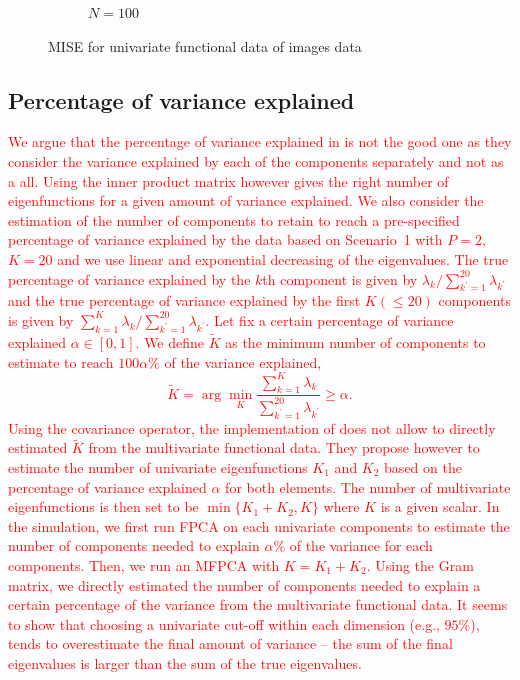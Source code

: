\begin{results}
\begin{figure}
\begin{subfigure}[b]{0.49\textwidth}
         \caption{$N = 100$}
         \label{fig:mise_mfd_2d_100}
    \end{subfigure}
    \caption{MISE for univariate functional data of images data}
    \label{fig:mise_mfd_2d}
\end{figure}

\end{results}



\subsection{Percentage of variance explained} %
\label{sub:percentage_of_variance_explained_simulation}

\textcolor{red}{We argue that the percentage of variance explained in \cite{happMultivariateFunctionalPrincipal2018a} is not the good one as they consider the variance explained by each of the components separately and not as a all. Using the inner product matrix however gives the right number of eigenfunctions for a given amount of variance explained.
We also consider the estimation of the number of components to retain to reach a pre-specified percentage of variance explained by the data based on Scenario~1 with $P = 2$, $K = 20$ and we use linear and exponential decreasing of the eigenvalues. The true percentage of variance explained by the $k$th component is given by $\lambda_k / \sum_{k^\prime = 1}^{20} \lambda_{k^\prime}$ and the true percentage of variance explained by the first $K (\leq 20)$ components is given by $\sum_{k = 1}^K \lambda_k / \sum_{k^\prime = 1}^{20} \lambda_{k^\prime}$.
Let fix a certain percentage of variance explained $\alpha \in [0, 1]$. We define $\widetilde{K}$ as the minimum number of components to estimate to reach $100\alpha\%$ of the variance explained,
\begin{equation}
    \widetilde{K} = \arg\min_K \frac{\sum_{k = 1}^K \lambda_k}{\sum_{k^\prime = 1}^{20} \lambda_{k^\prime}} \geq \alpha.
\end{equation}
Using the covariance operator, the implementation of \cite{happMultivariateFunctionalPrincipal2018a} does not allow to directly estimated $\widetilde{K}$ from the multivariate functional data. They propose however to estimate the number of univariate eigenfunctions $K_1$ and $K_2$ based on the percentage of variance explained $\alpha$ for both elements. The number of multivariate eigenfunctions is then set to be $\min\{K_1 + K_2, K\}$ where $K$ is a given scalar. In the simulation, we first run FPCA on each univariate components to estimate the number of components needed to explain $\alpha\%$ of the variance for each components. Then, we run an MFPCA with $K = K_1 + K_2$. Using the Gram matrix, we directly estimated the number of components needed to explain a certain percentage of the variance from the multivariate functional data.
It seems to show that choosing a univariate cut-off within each dimension (e.g., $95\%$), tends to overestimate the final amount of variance – the sum of the final eigenvalues is larger than the sum of the true eigenvalues.}



